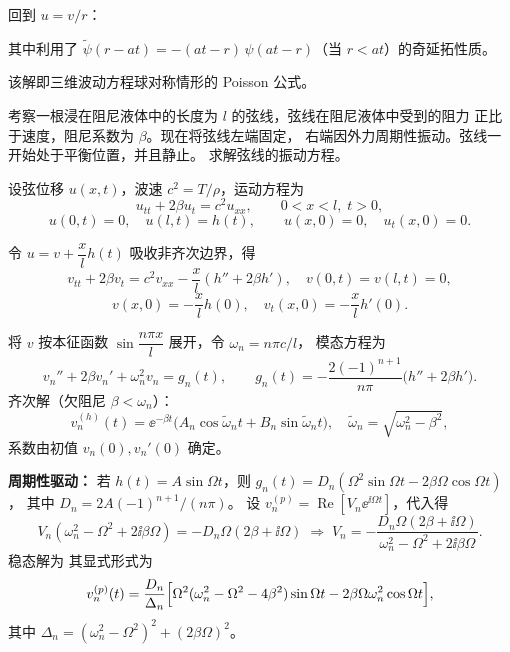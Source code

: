 \begin{question}[三维球对称波动方程]
\begin{solution}
回到 $u = v/r$：

其中利用了 $\tilde\psi(r-at) = -(at-r)\,\psi(at-r)$（当 $r<at$）的奇延拓性质。

该解即三维波动方程球对称情形的 Poisson 公式。

\end{solution}
\end{question}

\begin{question}[阻尼弦的受迫振动]

考察一根浸在阻尼液体中的长度为 $l$ 的弦线，弦线在阻尼液体中受到的阻力
正比于速度，阻尼系数为 $\beta$。现在将弦线左端固定，
右端因外力周期性振动。弦线一开始处于平衡位置，并且静止。
求解弦线的振动方程。

\begin{solution}

设弦位移 $u(x,t)$，波速 $c^2=T/\rho$，运动方程为
\[
u_{tt}+2\beta u_t = c^2 u_{xx},\qquad 0<x<l,\;t>0,
\]
\[
u(0,t)=0,\quad u(l,t)=h(t),\qquad
u(x,0)=0,\quad u_t(x,0)=0.
\]

令 $u=v+\dfrac{x}{l}h(t)$ 吸收非齐次边界，得
\[
v_{tt}+2\beta v_t = c^2 v_{xx}-\dfrac{x}{l}(h''+2\beta h'),\quad
v(0,t)=v(l,t)=0,
\]
\[
v(x,0)=-\dfrac{x}{l}h(0),\quad v_t(x,0)=-\dfrac{x}{l}h'(0).
\]

将 $v$ 按本征函数 $\sin\dfrac{n\pi x}{l}$ 展开，令 $\omega_n=n\pi c/l$，
模态方程为
\[
v_n''+2\beta v_n'+\omega_n^2 v_n = g_n(t),\qquad
g_n(t)=-\frac{2(-1)^{n+1}}{n\pi}\bigl(h''+2\beta h'\bigr).
\]
齐次解（欠阻尼 $\beta<\omega_n$）：
\[
v_n^{(h)}(t)=\ee^{-\beta t}\bigl(A_n\cos\tilde\omega_n t+B_n\sin\tilde\omega_n t\bigr),\quad
\tilde\omega_n=\sqrt{\omega_n^2-\beta^2},
\]
系数由初值 $v_n(0),v_n'(0)$ 确定。

\noindent\textbf{周期性驱动：} 若 $h(t)=A\sin\Omega t$，则
$g_n(t)=D_n(\Omega^2\sin\Omega t-2\beta\Omega\cos\Omega t)$，
其中 $D_n=2A(-1)^{n+1}/(n\pi)$。
设 $v_n^{(p)}=\operatorname{Re}[V_n\ee^{\ii\Omega t}]$，代入得
\[
V_n(\omega_n^2-\Omega^2+2\ii\beta\Omega)
= -D_n\Omega(2\beta+\ii\Omega)
\;\Longrightarrow\;
V_n = -\frac{D_n\Omega(2\beta+\ii\Omega)}
{\omega_n^2-\Omega^2+2\ii\beta\Omega}.
\]
稳态解为
其显式形式为
\[
v_n^{(p)}(t)=\frac{D_n}{\Delta_n}\Bigl[
\Omega^2(\omega_n^2-\Omega^2-4\beta^2)\sin\Omega t
-2\beta\Omega\omega_n^2\cos\Omega t
\Bigr],
\]
其中 $\Delta_n=(\omega_n^2-\Omega^2)^2+(2\beta\Omega)^2$。


\end{solution}
\end{question}

